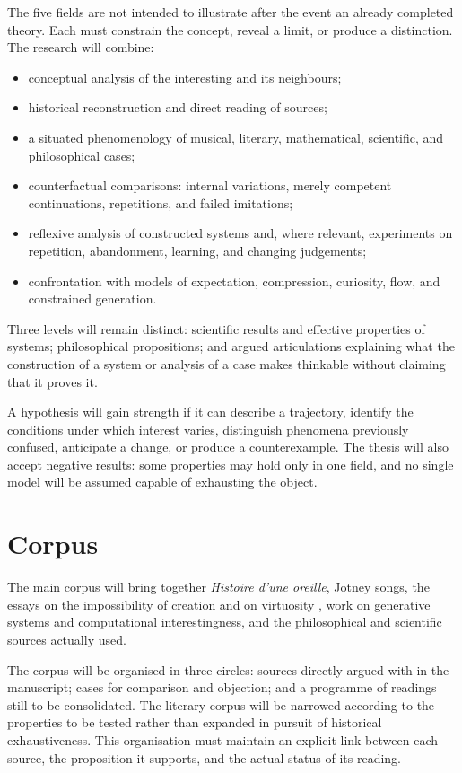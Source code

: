 \documentclass[11pt,a4paper]{article}
\begin{document}
The five fields are not intended to illustrate after the event an already
completed theory. Each must constrain the concept, reveal a limit, or produce a
distinction. The research will combine:

\begin{itemize}
  \item conceptual analysis of the interesting and its neighbours;
  \item historical reconstruction and direct reading of sources;
  \item a situated phenomenology of musical, literary, mathematical,
        scientific, and philosophical cases;
  \item counterfactual comparisons: internal variations, merely competent
        continuations, repetitions, and failed imitations;
  \item reflexive analysis of constructed systems and, where relevant,
        experiments on repetition, abandonment, learning, and changing
        judgements;
  \item confrontation with models of expectation, compression, curiosity,
        flow, and constrained generation.
\end{itemize}

Three levels will remain distinct: scientific results and effective properties
of systems; philosophical propositions; and argued articulations explaining
what the construction of a system or analysis of a case makes thinkable without
claiming that it proves it.

A hypothesis will gain strength if it can describe a trajectory, identify the
conditions under which interest varies, distinguish phenomena previously
confused, anticipate a change, or produce a counterexample. The thesis will also
accept negative results: some properties may hold only in one field, and no
single model will be assumed capable of exhausting the object.

\section{Corpus}

The main corpus will bring together \emph{Histoire d'une oreille}, Jotney songs,
the essays on the impossibility of creation and on virtuosity
\parencite{pachet2018oreille,pachet2026impossibilite,pachet2027virtuosite}, work
on generative systems and computational interestingness, and the philosophical
and scientific sources actually used.

The corpus will be organised in three circles: sources directly argued with in
the manuscript; cases for comparison and objection; and a programme of readings
still to be consolidated. The literary corpus will be narrowed according to the
properties to be tested rather than expanded in pursuit of historical
exhaustiveness. This organisation must maintain an explicit link between each
source, the proposition it supports, and the actual status of its reading.
\end{document}
